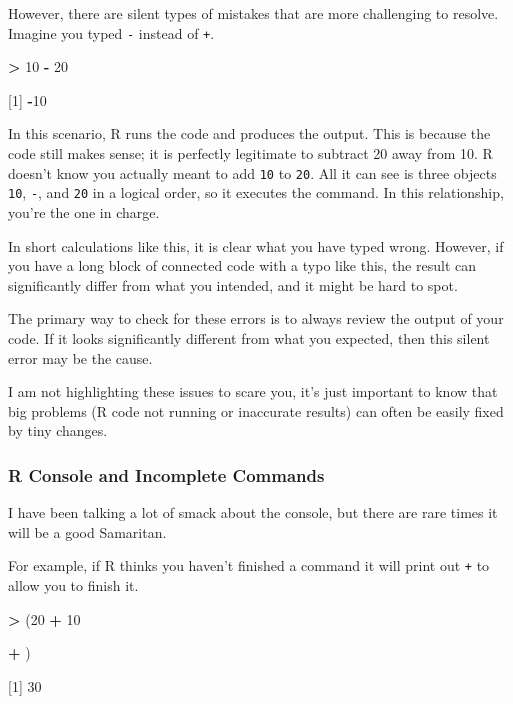 \documentclass[
]{book}
\newenvironment{Shaded}{\begin{snugshade}}{\end{snugshade}}
\newcommand{\DecValTok}[1]{\textcolor[rgb]{0.00,0.00,0.81}{#1}}
\newcommand{\NormalTok}[1]{#1}
\newcommand{\SpecialCharTok}[1]{\textcolor[rgb]{0.81,0.36,0.00}{\textbf{#1}}}
\begin{document}
However, there are silent types of mistakes that are more challenging to resolve. Imagine you typed \texttt{-} instead of \texttt{+}.

\begin{Shaded}
\begin{Highlighting}[]
\SpecialCharTok{\textgreater{}} \DecValTok{10} \SpecialCharTok{{-}} \DecValTok{20}

\NormalTok{[}\DecValTok{1}\NormalTok{] }\SpecialCharTok{{-}}\DecValTok{10}
\end{Highlighting}
\end{Shaded}

In this scenario, R runs the code and produces the output. This is because the code still makes sense; it is perfectly legitimate to subtract 20 away from 10. R doesn't know you actually meant to add \texttt{10} to \texttt{20}. All it can see is three objects \texttt{10}, \texttt{-}, and \texttt{20} in a logical order, so it executes the command. In this relationship, you're the one in charge.

In short calculations like this, it is clear what you have typed wrong. However, if you have a long block of connected code with a typo like this, the result can significantly differ from what you intended, and it might be hard to spot.

The primary way to check for these errors is to always review the output of your code. If it looks significantly different from what you expected, then this silent error may be the cause.

I am not highlighting these issues to scare you, it's just important to know that big problems (R code not running or inaccurate results) can often be easily fixed by tiny changes.

\subsubsection{R Console and Incomplete Commands}\label{r-console-and-incomplete-commands}

I have been talking a lot of smack about the console, but there are rare times it will be a good Samaritan.

For example, if R thinks you haven't finished a command it will print out \texttt{+} to allow you to finish it.

\begin{Shaded}
\begin{Highlighting}[]
\SpecialCharTok{\textgreater{}}\NormalTok{ (}\DecValTok{20} \SpecialCharTok{+} \DecValTok{10}
 
\SpecialCharTok{+}\NormalTok{ )}

\NormalTok{[}\DecValTok{1}\NormalTok{] }\DecValTok{30}
\end{Highlighting}
\end{Shaded}
\end{document}
